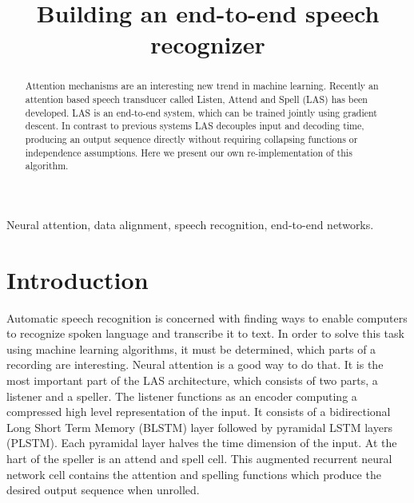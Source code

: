 \documentclass{article}
\title{Building an end-to-end speech recognizer}
\begin{document}
\maketitle
%
\begin{abstract}
Attention mechanisms are an interesting new trend in machine learning. Recently an attention based speech transducer called Listen, Attend and Spell (LAS) \cite{Chan2015} has been developed. LAS is an end-to-end system, which can be trained jointly using gradient descent. In contrast to previous systems LAS decouples input and decoding time, producing an output sequence directly without requiring collapsing functions or independence assumptions. Here we present our own re-implementation of this algorithm. 
\end{abstract}
%
\begin{keywords}
Neural attention, data alignment, speech recognition, end-to-end networks.
\end{keywords}
%
\section{Introduction}
\label{sec:intro}
Automatic speech recognition is concerned with finding ways to enable computers
to recognize spoken language and transcribe it to text. In order to solve this task using machine learning algorithms, it must be determined, which parts of a recording are interesting. 
Neural attention is a good way to do that. It is the most important part of the LAS architecture, which consists of two parts, a listener and a speller. 
The listener functions as an encoder computing a compressed high level representation of the input. It consists of a bidirectional Long Short Term Memory (BLSTM) layer followed by pyramidal LSTM layers (PLSTM). Each pyramidal layer halves the time dimension of the input.
At the hart of the speller is an attend and spell cell. This augmented recurrent neural network cell contains the attention and spelling functions which produce the desired output sequence when unrolled.
\end{document}
